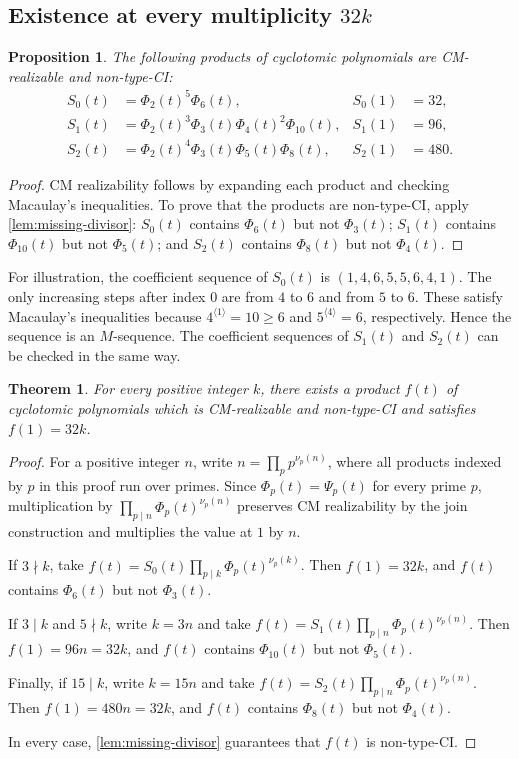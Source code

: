 \documentclass[11pt,a4paper]{amsart}
\newtheorem{theorem}{Theorem}[section]
\newtheorem{proposition}[proposition]{Proposition}
\theoremstyle{definition}
\theoremstyle{remark}
\begin{document}
\subsection{Existence at every multiplicity \texorpdfstring{$32k$}{32k}}\label{sec:32k}
\begin{proposition}\label{prop:32-seeds}
The following products of cyclotomic polynomials are CM-realizable and non-type-CI:
\begin{align*}
S_0(t)&=\Phi_2(t)^5\Phi_6(t),&S_0(1)&=32,\\
S_1(t)&=\Phi_2(t)^3\Phi_3(t)\Phi_4(t)^2\Phi_{10}(t),&S_1(1)&=96,\\
S_2(t)&=\Phi_2(t)^4\Phi_3(t)\Phi_5(t)\Phi_8(t),&S_2(1)&=480.
\end{align*}
\end{proposition}
\begin{proof}
CM realizability follows by expanding each product and checking Macaulay's inequalities. To prove that the products are non-type-CI, apply \cref{lem:missing-divisor}: $S_0(t)$ contains $\Phi_6(t)$ but not $\Phi_3(t)$; $S_1(t)$ contains $\Phi_{10}(t)$ but not $\Phi_5(t)$; and $S_2(t)$ contains $\Phi_8(t)$ but not $\Phi_4(t)$.
\end{proof}
For illustration, the coefficient sequence of $S_0(t)$ is $(1,4,6,5,5,6,4,1)$. The only increasing steps after index $0$ are from $4$ to $6$ and from $5$ to $6$. These satisfy Macaulay's inequalities because $4^{\langle1\rangle}=10\ge6$ and $5^{\langle4\rangle}=6$, respectively. Hence the sequence is an $M$-sequence. The coefficient sequences of $S_1(t)$ and $S_2(t)$ can be checked in the same way.

\begin{theorem}\label{thm:32k}
For every positive integer $k$, there exists a product $f(t)$ of cyclotomic polynomials which is CM-realizable and non-type-CI and satisfies $f(1)=32k$.
\end{theorem}
\begin{proof}
For a positive integer $n$, write $n=\prod_p p^{\nu_p(n)}$, where all products indexed by $p$ in this proof run over primes. Since $\Phi_p(t)=\Psi_p(t)$ for every prime $p$, multiplication by $\prod_{p\mid n}\Phi_p(t)^{\nu_p(n)}$ preserves CM realizability by the join construction and multiplies the value at $1$ by $n$.

If $3\nmid k$, take $f(t)=S_0(t)\prod_{p\mid k}\Phi_p(t)^{\nu_p(k)}$. Then $f(1)=32k$, and $f(t)$ contains $\Phi_6(t)$ but not $\Phi_3(t)$.

If $3\mid k$ and $5\nmid k$, write $k=3n$ and take $f(t)=S_1(t)\prod_{p\mid n}\Phi_p(t)^{\nu_p(n)}$. Then $f(1)=96n=32k$, and $f(t)$ contains $\Phi_{10}(t)$ but not $\Phi_5(t)$.

Finally, if $15\mid k$, write $k=15n$ and take $f(t)=S_2(t)\prod_{p\mid n}\Phi_p(t)^{\nu_p(n)}$. Then $f(1)=480n=32k$, and $f(t)$ contains $\Phi_8(t)$ but not $\Phi_4(t)$.

In every case, \cref{lem:missing-divisor} guarantees that $f(t)$ is non-type-CI.
\end{proof}
\end{document}
